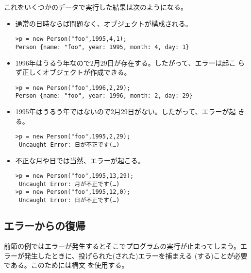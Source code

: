 これをいくつかのデータで実行した結果は次のようになる。
\begin{itemize}
 \item 通常の日時ならば問題なく、オブジェクトが構成される。
\begin{Verbatim}
>p = new Person("foo",1995,4,1);
Person {name: "foo", year: 1995, month: 4, day: 1}
\end{Verbatim}
 \item 1996年はうるう年なので2月29日が存在する。したがって、エラーは起こ
			 らず正しくオブジェクトが作成できる。
\begin{Verbatim}
>p = new Person("foo",1996,2,29);
Person {name: "foo", year: 1996, month: 2, day: 29}
\end{Verbatim}
 \item 1995年はうるう年ではないので2月29日がない。したがって、エラーが起
			 きる。
\begin{Verbatim}
>p = new Person("foo",1995,2,29);
 Uncaught Error: 日が不正です(…)
\end{Verbatim}
 \item 不正な月や日では当然、エラーが起こる。
\begin{Verbatim}
>p = new Person("foo",1995,13,29);
 Uncaught Error: 月が不正です(…)
>p = new Person("foo",1995,12,0);
 Uncaught Error: 日が不正です(…)
\end{Verbatim}
\end{itemize}


\subsection{エラーからの復帰}
前節の例ではエラーが発生するとそこでプログラムの実行が止まってしまう。エ
ラーが発生したときに、投げられた(された)エラーを捕まえる
(する)ことが必要である。このためには構文
を使用する。

